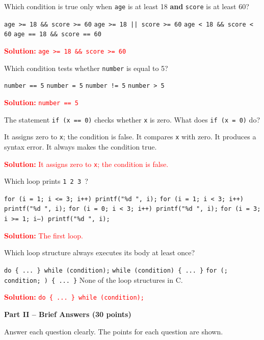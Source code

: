 \documentclass[12pt,a4paper,addpoints]{exam}
\newcommand{\answertext}[1]{%
  \ifprintanswers\par\noindent\textcolor{red}{\textbf{Solution:} #1}\par\fi}
\begin{document}
\begin{questions}
\question[2] Which condition is true only when \texttt{age} is at least 18 \textbf{and} \texttt{score} is at least 60?
\begin{choices}
  \choice \texttt{age >= 18 \&\& score >= 60}
  \choice \texttt{age >= 18 || score >= 60}
  \choice \texttt{age < 18 \&\& score < 60}
  \choice \texttt{age == 18 \&\& score == 60}
\end{choices}
\answertext{\texttt{age >= 18 \&\& score >= 60}}

\question[2] Which condition tests whether \texttt{number} is equal to 5?
\begin{choices}
  \choice \texttt{number == 5}
  \choice \texttt{number = 5}
  \choice \texttt{number != 5}
  \choice \texttt{number > 5}
\end{choices}
\answertext{\texttt{number == 5}}

\question[2] The statement \texttt{if (x == 0)} checks whether \texttt{x} is zero. What does \texttt{if (x = 0)} do?
\begin{choices}
  \choice It assigns zero to \texttt{x}; the condition is false.
  \choice It compares \texttt{x} with zero.
  \choice It produces a syntax error.
  \choice It always makes the condition true.
\end{choices}
\answertext{It assigns zero to \texttt{x}; the condition is false.}

\question[2] Which loop prints \texttt{1 2 3 }?
\begin{choices}
  \choice \texttt{for (i = 1; i <= 3; i++) printf("\%d ", i);}
  \choice \texttt{for (i = 1; i < 3; i++) printf("\%d ", i);}
  \choice \texttt{for (i = 0; i < 3; i++) printf("\%d ", i);}
  \choice \texttt{for (i = 3; i >= 1; i--) printf("\%d ", i);}
\end{choices}
\answertext{The first loop.}

\question[2] Which loop structure always executes its body at least once?
\begin{choices}
  \choice \texttt{do \{ ... \} while (condition);}
  \choice \texttt{while (condition) \{ ... \}}
  \choice \texttt{for (; condition; ) \{ ... \}}
  \choice None of the loop structures in C.
\end{choices}
\answertext{\texttt{do \{ ... \} while (condition);}}

\begin{center}\large\textbf{Part II -- Brief Answers (30 points)}\end{center}
\noindent Answer each question clearly. The points for each question are shown.


\end{questions}
\end{document}
